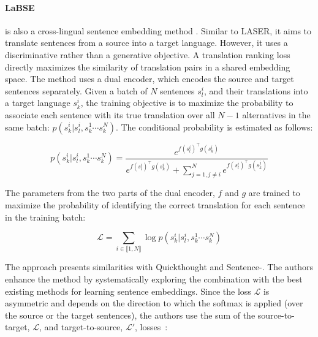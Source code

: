 \paragraph{LaBSE} is also a cross-lingual sentence embedding method \parencite{feng_22}. Similar to LASER, it aims to translate sentences from a source into a target language. However, it uses a discriminative rather than a generative objective. A translation ranking loss directly maximizes the similarity of translation pairs in a shared embedding space. The method uses a dual encoder, which encodes the source and target sentences separately. 
Given a batch of $N$ sentences $s^i_l$, and their translations into a target language $s^i_k$, the training objective is to maximize the probability to associate each sentence with its true translation over all $N-1$ alternatives in the same batch: $p(s^i_k | s^i_l, s^1_k \cdots s^N_k)$. The conditional probability is estimated as follows:

\begin{equation*}
    p(s^i_k | s^i_l, s^1_k \cdots s^N_k) = \frac{e^{f(s^i_l)^{\top}g(s^i_k)}}{e^{f(s^i_l)^{\top} g(s^i_k)}+\sum_{j=1, j\neq i}^Ne^{f(s^i_l)^{\top}g(s^j_k)}} 
\end{equation*}

The parameters from the two parts of the dual encoder, $f$ and $g$ are trained to maximize the probability of identifying the correct translation for each sentence in the training batch:

\begin{equation*}
    \mathcal{L} = \sum_{i \in \llbracket1,N\rrbracket} \log p(s^i_k | s^i_l, s^1_k \cdots s^N_k)
\end{equation*}

The approach presents similarities with Quickthought \parencite{logeswaran_18} and Sentence-\bert \parencite{reimers_19}. The authors enhance the method by systematically exploring the combination with the best existing methods for learning sentence embeddings. %
Since the loss $\mathcal{L}$ is asymmetric and depends on the direction to which the softmax is applied (over the source or the target sentences), the authors use the sum of the source-to-target, $\mathcal{L}$, and target-to-source, $\mathcal{L}'$, losses~\parencite{yang_19}:


